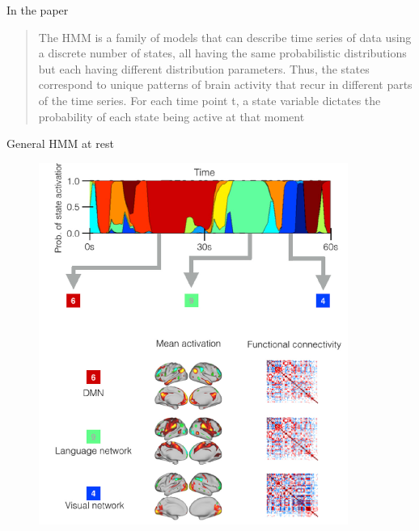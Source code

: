 \documentclass{beamer}
\begin{document}
\begin{frame}{In the paper}
	
\begin{quote}
	The HMM is a family of models that can describe time series of data
	using a discrete number of states, all having the same probabilistic distributions
	but each having different distribution parameters. Thus, the
	states correspond to unique patterns of brain activity that recur in
	different parts of the time series. For each time point t, a state variable
	dictates the probability of each state being active at that moment
\end{quote}
\end{frame}

\begin{frame}{General HMM at rest}
			\begin{figure}[h]
		\centering
			\includegraphics[scale=0.6]{../Figures/fig_vidaurre_1a.png}
	\end{figure}
\end{frame}
\end{document}
